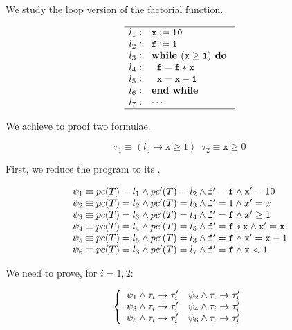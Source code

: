 


We study the loop version of the factorial function.


\[
	\begin{array}{l@{\hspace{0.3em}}c@{\hspace{1em}}l}
	\hline
		l_1 & : & \mathtt{x := 10} \\
		l_2 & : & \mathtt{f := 1} \\
		l_3 & : & \mathtt{\textbf{while } (x\geq 1) \textbf{ do }} \\
		l_4 & : & \mathtt{\;\;f = f*x} \\
		l_5 & : & \mathtt{\;\;x=x-1} \\ 	
		l_6 & : & \mathtt{\textbf{end while}}\\
		l_7 & : & \mathtt{\cdots}\\
	\hline
	\end{array}
\]
\label{simple:example}




We achieve to proof two formulae.

\[\tau_1 \equiv (l_5 \to \mathtt{x}\geq 1) \;\; \tau_2 \equiv \mathtt{x} \geq 0\]

First, we reduce the program to its \VC.


\[
	\begin{array}{l}
		 \psi_1 \equiv pc(T) = l_1 \wedge pc'(T) = l_2 \wedge \mathtt{f'=f} \wedge \mathtt{x}' = 10\\
		 \psi_2 \equiv pc(T) = l_2 \wedge pc'(T) = l_3 \wedge \mathtt{f}' = 1 \wedge x'=x\\
		 \psi_3 \equiv pc(T) = l_3 \wedge pc'(T) = l_4 \wedge \mathtt{f'=f} \wedge x'\geq 1\\
		 \psi_4 \equiv pc(T) = l_4 \wedge pc'(T) = l_5 \wedge \mathtt{f}' = \mathtt{f*x} \wedge \mathtt{x'=x}\\
		 \psi_5 \equiv pc(T) = l_5 \wedge pc'(T) = l_3 \wedge \mathtt{f'=f} \wedge \mathtt{x'=x-1}\\
		 \psi_6 \equiv pc(T) = l_3 \wedge pc'(T) = l_7 \wedge \mathtt{f'=f} \wedge \mathtt{x<1}
	\end{array}
\]

We need to prove, for $i=1,2$:

\[
	\left\{
		\begin{array}{lr}
			\psi_1 \wedge \tau_i \to \tau_i' &
			\psi_2 \wedge \tau_i \to \tau_i'\\
			\psi_3 \wedge \tau_i \to \tau_i' &
			\psi_4 \wedge \tau_i \to \tau_i'\\
			\psi_5 \wedge \tau_i \to \tau_i' &
			\psi_6 \wedge \tau_i \to \tau_i'
		\end{array}
	\right.
\]

